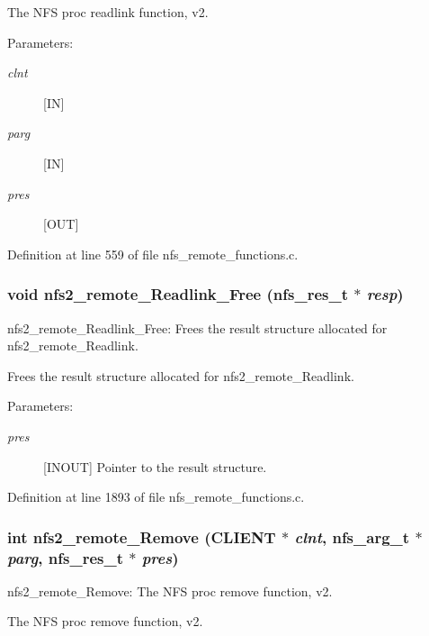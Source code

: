 The NFS proc readlink function, v2.

\begin{Desc}
\item[Parameters:]
\begin{description}
\item[{\em clnt}][IN] \item[{\em parg}][IN] \item[{\em pres}][OUT] \end{description}
\end{Desc}


Definition at line 559 of file nfs\_\-remote\_\-functions.c.
\subsubsection{\setlength{\rightskip}{0pt plus 5cm}void nfs2\_\-remote\_\-Readlink\_\-Free (nfs\_\-res\_\-t $\ast$ {\em resp})}\label{group__NFSprocs_ga71}


nfs2\_\-remote\_\-Readlink\_\-Free: Frees the result structure allocated for nfs2\_\-remote\_\-Readlink.

Frees the result structure allocated for nfs2\_\-remote\_\-Readlink.

\begin{Desc}
\item[Parameters:]
\begin{description}
\item[{\em pres}][INOUT] Pointer to the result structure. \end{description}
\end{Desc}


Definition at line 1893 of file nfs\_\-remote\_\-functions.c.
\subsubsection{\setlength{\rightskip}{0pt plus 5cm}int nfs2\_\-remote\_\-Remove (CLIENT $\ast$ {\em clnt}, nfs\_\-arg\_\-t $\ast$ {\em parg}, nfs\_\-res\_\-t $\ast$ {\em pres})}\label{group__NFSprocs_ga10}


nfs2\_\-remote\_\-Remove: The NFS proc remove function, v2.

The NFS proc remove function, v2.

